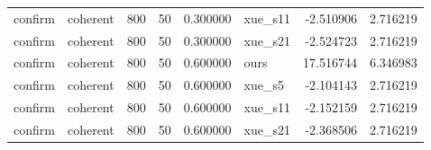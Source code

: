 \begin{longtable}{llrrrlrr}
confirm & coherent & 800 & 50 & 0.300000 & xue\_s11 & -2.510906 & 2.716219 \\
confirm & coherent & 800 & 50 & 0.300000 & xue\_s21 & -2.524723 & 2.716219 \\
confirm & coherent & 800 & 50 & 0.600000 & ours & 17.516744 & 6.346983 \\
confirm & coherent & 800 & 50 & 0.600000 & xue\_s5 & -2.104143 & 2.716219 \\
confirm & coherent & 800 & 50 & 0.600000 & xue\_s11 & -2.152159 & 2.716219 \\
confirm & coherent & 800 & 50 & 0.600000 & xue\_s21 & -2.368506 & 2.716219 \\
\end{longtable}
